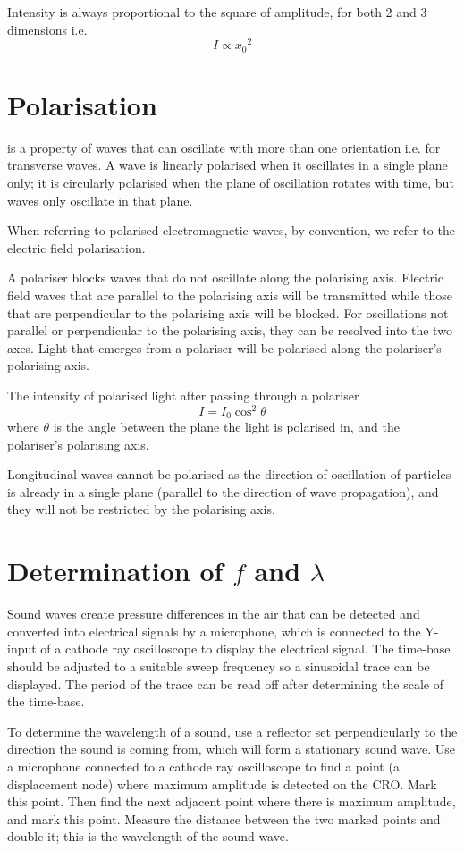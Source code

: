 \documentclass[Physics.tex]{subfiles}
\begin{document}
Intensity is always proportional to the square of amplitude, for both 2 and 3 dimensions i.e. \begin{equation}I \propto {x_0}^2\end{equation}
\section{Polarisation}
 is a property of waves that can oscillate with more than one orientation i.e. for transverse waves. A wave is linearly polarised when it oscillates in a single plane only; it is circularly polarised when the plane of oscillation rotates with time, but waves only oscillate in that plane.

When referring to polarised electromagnetic waves, by convention, we refer to the electric field polarisation.

A polariser blocks waves that do not oscillate along the polarising axis. Electric field waves that are parallel to the polarising axis will be transmitted while those that are perpendicular to the polarising axis will be blocked. For oscillations not parallel or perpendicular to the polarising axis, they can be resolved into the two axes. Light that emerges from a polariser will be polarised along the polariser's polarising axis.

The intensity of polarised light after passing through a polariser \begin{equation}I = I_0\cos^2\theta\end{equation} where \(\theta\) is the angle between the plane the light is polarised in, and the polariser's polarising axis.

Longitudinal waves cannot be polarised as the direction of oscillation of particles is already in a single plane (parallel to the direction of wave propagation), and they will not be restricted by the polarising axis.
\section{Determination of \(f\) and \(\lambda\)}
Sound waves create pressure differences in the air that can be detected and converted into electrical signals by a microphone, which is connected to the Y-input of a cathode ray oscilloscope to display the electrical signal. The time-base should be adjusted to a suitable sweep frequency so a sinusoidal trace can be displayed. The period of the trace can be read off after determining the scale of the time-base.

To determine the wavelength of a sound, use a reflector set perpendicularly to the direction the sound is coming from, which will form a stationary sound wave. Use a microphone connected to a cathode ray oscilloscope to find a point (a displacement node) where maximum amplitude is detected on the CRO. Mark this point. Then find the next adjacent point where there is maximum amplitude, and mark this point. Measure the distance between the two marked points and double it; this is the wavelength of the sound wave.
\end{document}
